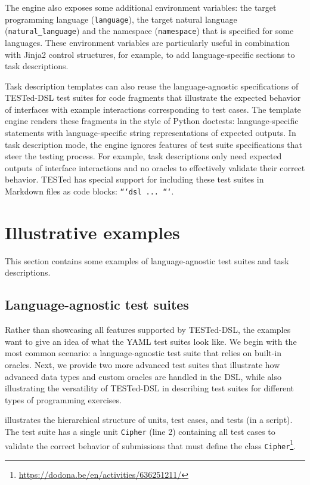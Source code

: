 \documentclass[../main]{subfiles}
\begin{document}
The engine also exposes some additional environment variables: the target programming language (\texttt{language}), the target natural language (\texttt{natural\_language}) and the namespace (\texttt{namespace}) that is specified for some languages.
These environment variables are particularly useful in combination with Jinja2 control structures, for example, to add language-specific sections to task descriptions.

Task description templates can also reuse the language-agnostic specifications of TESTed-DSL test suites for code fragments that illustrate the expected behavior of interfaces with example interactions corresponding to test cases.
The template engine renders these fragments in the style of Python doctests: language-specific statements with language-specific string representations of expected outputs.
In task description mode, the engine ignores features of test suite specifications that steer the testing process.
For example, task descriptions only need expected outputs of interface interactions and no oracles to effectively validate their correct behavior.
TESTed has special support for including these test suites in Markdown files as code blocks: \texttt{```dsl ... ```}.

\section{Illustrative examples}\label{sec:dsl-illustrative-examples}

This section contains some examples of language-agnostic test suites and task descriptions.

\subsection{Language-agnostic test suites}\label{subsec:example-language-agnostic-test-suites}

Rather than showcasing all features supported by TESTed-DSL, the examples want to give an idea of what the YAML test suites look like.
We begin with the most common scenario: a language-agnostic test suite that relies on built-in oracles.
Next, we provide two more advanced test suites that illustrate how advanced data types and custom oracles are handled in the DSL, while also illustrating the versatility of TESTed-DSL in describing test suites for different types of programming exercises.

 illustrates the hierarchical structure of units, test cases, and tests (in a script).
The test suite has a single unit \texttt{Cipher} (line 2) containing all test cases to validate the correct behavior of submissions that must define the class \texttt{Cipher}\footnote{\url{https://dodona.be/en/activities/636251211/}}.
\end{document}
